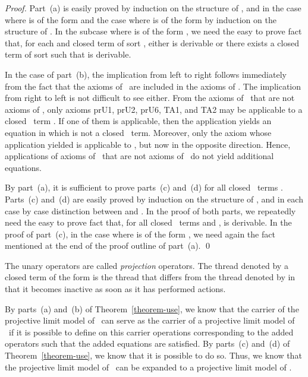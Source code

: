 \documentclass{llncs}
\begin{document}
\begin{proof}
Part~(a) is easily proved by induction on the structure of , and in 
the case where  is of the form  and the case where 
 is of the form  by induction on the structure of 
.
In the subcase where  is of the form 
\mbox{}, we need the easy to prove fact 
that, for each  and closed term  of sort , 
either  is derivable or there exists a closed term 
 of sort  such that  is 
derivable.

In the case of part~(b), the implication from left to right follows 
immediately from the fact that the axioms of \prBTA\ are included in the 
axioms of \prTSI.
The implication from right to left is not difficult to see either. 
From the axioms of \prTSI\ that are not axioms of \prBTA, only axioms 
prU1, prU2, prU6, TA1, and TA2 may be applicable to a closed \prBTA\ 
term .
If one of them is applicable, then the application yields an equation 
 in which  is not a closed \prBTA\ term.
Moreover, only the axiom whose application yielded  is 
applicable to , but now in the opposite direction.
Hence, applications of axioms of \prTSI\ that are not axioms of \prBTA\
do not yield additional equations.

By part~(a), it is sufficient to prove parts~(c) and~(d) for all closed 
\prBTA\ terms .
Parts~(c) and~(d) are easily proved by induction on the structure of 
, and in each case by case distinction between  and 
.
In the proof of both parts, we repeatedly need the easy to prove fact 
that, for all closed \prBTA\ terms  and , 
 is derivable.
In the proof of part~(c), in the case where  is of the form 
, we need again the fact mentioned at the end of the
proof outline of part~(a).
\qed
\end{proof}
The unary operators  are called \emph{projection} operators.
The thread denoted by a closed term of the form  is the 
thread that differs from the thread denoted by  in that it becomes 
inactive as soon as it has performed  actions.

By parts~(a) and~(b) of Theorem~\ref{theorem-use}, we know that the 
carrier of the projective limit model of \prBTA\ can serve as the 
carrier of a projective limit model of \prTSI\ if it is possible to 
define on this carrier operations corresponding to the added operators 
such that the added equations are  satisfied.
By  parts~(c) and~(d) of Theorem~\ref{theorem-use}, we know that it is 
possible to do so.
Thus, we know that the projective limit model of \prBTA\ can be expanded 
to a projective limit model of \prTSI.
\end{document}
